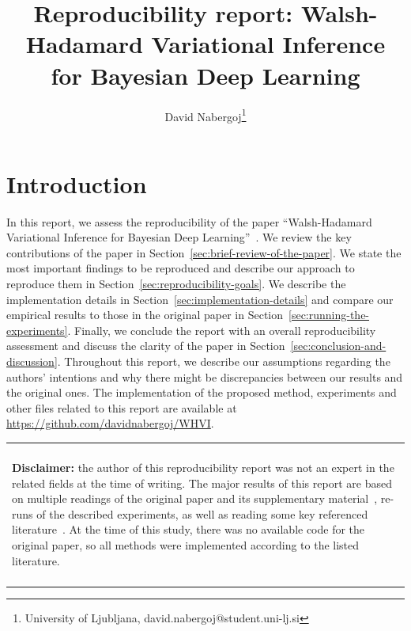 \documentclass[11pt, twocolumn]{article}
\title{Reproducibility report: Walsh-Hadamard Variational Inference for Bayesian Deep Learning}
\author{David Nabergoj\thanks{University of Ljubljana, david.nabergoj@student.uni-lj.si %
}}
\newenvironment{disclaimer}
    {
    \begin{center}
    \begin{tabular}{|p{0.9\hsize}|}
    \hline\\
    \begin{footnotesize}\textbf{Disclaimer:}}
    {
    \end{footnotesize}
    \\\\\hline
    \end{tabular}
    \end{center}
    }
\begin{document}
    \maketitle


    \section{Introduction}\label{sec:introduction}
    In this report, we assess the reproducibility of the paper ``Walsh-Hadamard Variational Inference for Bayesian Deep Learning''~\cite{rossi2019walsh}.
    We review the key contributions of the paper in Section~\ref{sec:brief-review-of-the-paper}.
    We state the most important findings to be reproduced and describe our approach to reproduce them in Section~\ref{sec:reproducibility-goals}.
    We describe the implementation details in Section~\ref{sec:implementation-details} and compare our empirical results to those in the original paper in Section~\ref{sec:running-the-experiments}.
    Finally, we conclude the report with an overall reproducibility assessment and discuss the clarity of the paper in Section~\ref{sec:conclusion-and-discussion}.
    Throughout this report, we describe our assumptions regarding the authors' intentions and why there might be discrepancies between our results and the original ones.
    The implementation of the proposed method, experiments and other files related to this report are available at \url{https://github.com/davidnabergoj/WHVI}.

    \begin{disclaimer}
    the author of this reproducibility report was not an expert in the related fields at the time of writing.
    The major results of this report are based on multiple readings of the original paper and its supplementary material~\cite{rossi2019walsh}, re-runs of the described experiments, as well as reading some key referenced literature~\cite{le2014fastfood, blundell2015weight, fino1976unified, kingma2015variational}.
    At the time of this study, there was no available code for the original paper, so all methods were implemented according to the listed literature.
    \end{disclaimer}
\end{document}
